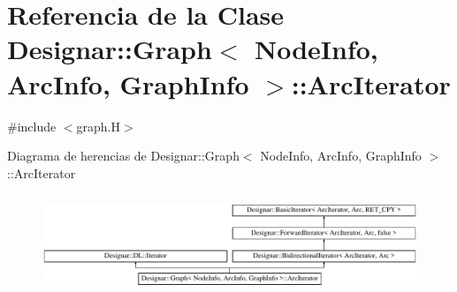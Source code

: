 \hypertarget{class_designar_1_1_graph_1_1_arc_iterator}{}\section{Referencia de la Clase Designar\+:\+:Graph$<$ Node\+Info, Arc\+Info, Graph\+Info $>$\+:\+:Arc\+Iterator}
\label{class_designar_1_1_graph_1_1_arc_iterator}


{\ttfamily \#include $<$graph.\+H$>$}

Diagrama de herencias de Designar\+:\+:Graph$<$ Node\+Info, Arc\+Info, Graph\+Info $>$\+:\+:Arc\+Iterator\begin{figure}[H]
\begin{center}
\leavevmode
\includegraphics[height=3.027027cm]{class_designar_1_1_graph_1_1_arc_iterator}
\end{center}
\end{figure}

